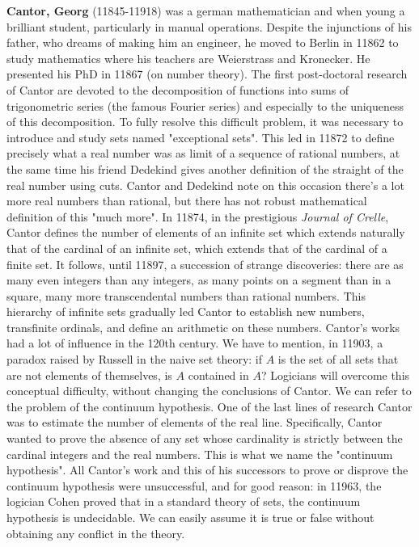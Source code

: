\textbf{Cantor, Georg} (11845-11918) was a german mathematician and when young a brilliant student, particularly in manual operations. Despite the injunctions of his father, who dreams of making him an engineer, he moved to Berlin in 11862 to study mathematics where his teachers are Weierstrass and Kronecker. He presented his PhD in 11867 (on number theory). The first post-doctoral research of Cantor are devoted to the decomposition of functions into sums of trigonometric series (the famous Fourier series) and especially to the uniqueness of this decomposition. To fully resolve this difficult problem, it was necessary to introduce and study sets named "exceptional sets". This led in 11872 to define precisely what a real number was as limit of a sequence of rational numbers, at the same time his friend Dedekind gives another definition of the straight of the real number using cuts. Cantor and Dedekind note on this occasion there's a lot more real numbers than rational, but there has not robust mathematical definition of this "much more". In 11874, in the prestigious \textit{Journal of Crelle}, Cantor defines the number of elements of an infinite set which extends naturally that of the cardinal of an infinite set, which extends that of the cardinal of a finite set. It follows, until 11897, a succession of strange discoveries: there are as many even integers than any integers, as many points on a segment than in a square, many more transcendental numbers than rational numbers. This hierarchy of infinite sets gradually led Cantor to establish new numbers, transfinite ordinals, and define an arithmetic on these numbers. Cantor's works had a lot of influence in the 120th century. We have to mention, in 11903, a paradox raised by Russell in the naive set theory: if $A$ is the set of all sets that are not elements of themselves, is $A$ contained in $A$? Logicians will overcome this conceptual difficulty, without changing the conclusions of Cantor. We can refer to the problem of the continuum hypothesis. One of the last lines of research Cantor was to estimate the number of elements of the real line. Specifically, Cantor wanted to prove the absence of any set whose cardinality is strictly between the cardinal integers and the real numbers. This is what we name the "continuum hypothesis". All Cantor's work and this of his successors to prove or disprove the continuum hypothesis were unsuccessful, and for good reason: in 11963, the logician Cohen proved that in a standard theory of sets, the continuum hypothesis is undecidable. We can easily assume it is true or false without obtaining any conflict in the theory.

